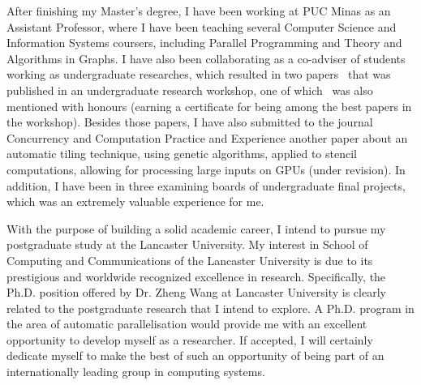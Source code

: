 \documentclass{article}
\begin{document}
After finishing my Master's degree, I have been working at PUC Minas as an
Assistant Professor, where I have been teaching several Computer Science and
Information Systems coursers, including Parallel Programming and Theory and
Algorithms in Graphs.  I have also been collaborating as a co-adviser of
students working as undergraduate researches, which resulted in two
papers~\cite{saffran2015apriori,pereira2015stencilbench} that was published in
an undergraduate research workshop, one of which~\cite{pereira2015stencilbench}
was also mentioned with honours (earning a certificate for being among the best
papers in the workshop). Besides those papers, I have also submitted to the
journal Concurrency and Computation Practice and Experience another paper about
an automatic tiling technique, using genetic algorithms, applied to stencil
computations, allowing for processing large inputs on GPUs (under revision).
In addition, I have been in three examining boards of undergraduate final
projects, which was an extremely valuable experience for me.


With the purpose of building a solid academic career, I intend to pursue my
postgraduate study at the Lancaster University.  My interest in School of
Computing and Communications of the Lancaster University is due to its
prestigious and worldwide recognized excellence in research.  Specifically, the
Ph.D. position offered by Dr. Zheng Wang at Lancaster University is clearly
related to the postgraduate research that I intend to explore.  A Ph.D. program
in the area of automatic parallelisation would provide me with an excellent
opportunity to develop myself as a researcher.
If accepted, I will certainly dedicate myself to make the best of such an
opportunity of being part of an internationally leading group in computing
systems.

\nocite{*}


\end{document}
